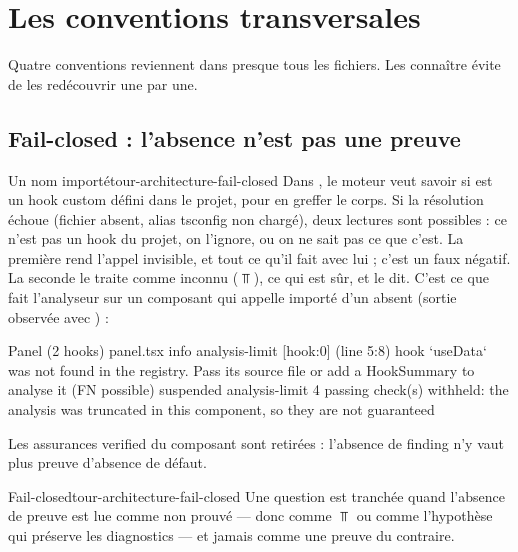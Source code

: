 \section{Les conventions transversales}
\label{sec:tour-architecture-conventions}

Quatre conventions reviennent dans presque tous les fichiers. Les connaître évite de les redécouvrir une par une.

\subsection{Fail-closed : l'absence n'est pas une preuve}

\begin{exemple}{Un nom importé}{tour-architecture-fail-closed}
Dans , le moteur veut savoir si  est un hook custom défini dans le projet, pour en greffer le corps. Si la résolution échoue (fichier absent, alias tsconfig non chargé), deux lectures sont possibles : \og ce n'est pas un hook du projet, on l'ignore\fg{}, ou \og on ne sait pas ce que c'est\fg{}. La première rend l'appel invisible, et tout ce qu'il fait avec lui ; c'est un faux négatif. La seconde le traite comme inconnu ($\Top$), ce qui est sûr, et le dit. C'est ce que fait l'analyseur sur un composant  qui appelle  importé d'un  absent (sortie observée avec ) :
\begin{sortie}
  Panel  (2 hooks)  panel.tsx
    info   analysis-limit  [hook:0]  (line 5:8)  hook `useData` was not found in the registry. Pass its source file or add a HookSummary to analyse it (FN possible)
    suspended  analysis-limit  4 passing check(s) withheld: the analysis was truncated in this component, so they are not guaranteed
\end{sortie}
Les assurances \og verified\fg{} du composant sont retirées : l'absence de finding n'y vaut plus preuve d'absence de défaut.
\end{exemple}

\begin{definition}{Fail-closed}{tour-architecture-fail-closed}
Une question est tranchée  quand l'absence de preuve est lue comme \og non prouvé\fg{} --- donc comme $\Top$ ou comme l'hypothèse qui préserve les diagnostics --- et jamais comme une preuve du contraire.
\end{definition}

